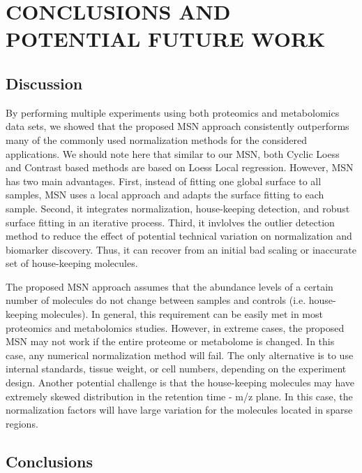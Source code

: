 \chapter{CONCLUSIONS AND POTENTIAL FUTURE WORK}

\section{Discussion}

By performing multiple experiments using both proteomics and metabolomics data sets, we showed that the proposed MSN approach consistently outperforms many of the commonly used normalization methods for the considered applications. We should note here that similar to our MSN, both Cyclic Loess and Contrast based methods are based on Loess Local regression. However, MSN has two main advantages. First, instead of fitting one global surface to all samples, MSN uses a local approach and adapts the surface fitting to each sample. Second, it integrates normalization, house-keeping detection, and robust surface fitting in an iterative process. Third, it invlolves the outlier detection method to reduce the effect of potential technical variation on normalization and biomarker discovery. Thus, it can recover from an initial bad scaling or inaccurate set of house-keeping molecules. 

The proposed MSN approach assumes that the abundance levels of a certain number of molecules do not change between samples and controls (i.e. house-keeping molecules). In general, this requirement can be easily met in most proteomics and metabolomics studies. However, in extreme cases, the proposed MSN may not work if the entire proteome or metabolome is changed. In this case, any numerical normalization method will fail. The only alternative is to use internal standards, tissue weight, or cell numbers, depending on the experiment design. Another potential challenge is that the house-keeping molecules may have extremely skewed distribution in the retention time - m/z plane. In this case, the normalization factors will have large variation for the molecules located in sparse regions.



\section{Conclusions}

